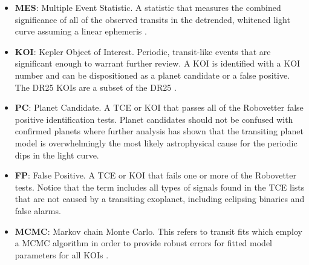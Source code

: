 \begin{itemize}
\item[] \textbf{MES}: Multiple Event Statistic. A statistic that measures the combined significance of all of the observed transits in the detrended, whitened light curve assuming a linear ephemeris \citep[][]{Jenkins2002b}.
\item[] \textbf{KOI}: Kepler Object of Interest. Periodic, transit-like events that are significant enough to warrant further review. A KOI is identified with a KOI number and can be dispositioned as a planet candidate or a false positive. The DR25 KOIs are a subset of the DR25 . 
\item[] \textbf{PC}: Planet Candidate. A TCE or KOI that passes all of the Robovetter false positive identification tests. Planet candidates should not be confused with confirmed planets where further analysis has shown that the transiting planet model is overwhelmingly the most likely astrophysical cause for the periodic dips in the \Kepler{} light curve.
\item[] \textbf{FP}: False Positive. A TCE or KOI that fails one or more of the Robovetter tests. Notice that the term includes all types of signals found in the TCE lists that are not caused by a transiting exoplanet, including eclipsing binaries and false alarms.
\item[] \textbf{MCMC}: Markov chain Monte Carlo. This refers to transit fits which employ a MCMC algorithm in order to provide robust errors for fitted model parameters for all KOIs
 \citep{Hoffman2017}. 



\end{itemize}